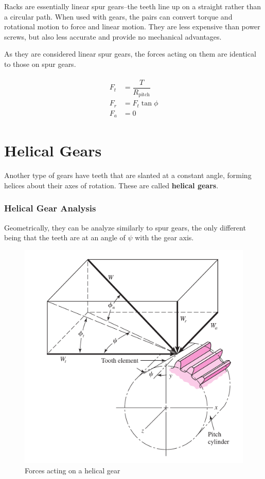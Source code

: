 \documentclass[a4paper,openany]{tufte-book}
\begin{document}
Racks are essentially linear spur gears--the teeth line up on a straight rather than a circular path. When used with gears, the pairs can convert torque and rotational motion to force and linear motion. They are less expensive than power screws, but also less accurate and provide no mechanical advantages.

As they are considered linear spur gears, the forces acting on them are identical to those on spur gears.

\begin{align}
  \begin{array}{ll}
  F_{t} &= \dfrac{T}{R_{\text{pitch}}} \\
  F_{r} &= F_t \tan \phi \\
  F_{a} &= 0
  \end{array}
\end{align}

\chapter{Helical Gears}
\label{sec:org5bc58f2}

Another type of gears have teeth that are slanted at a constant angle, forming helices about their axes of rotation. These are called \textbf{helical gears}.


\subsection{Helical Gear Analysis}
\label{sec:org992a3cf}

Geometrically, they can be analyze similarly to spur gears, the only different being that the teeth are at an angle of \(\psi\) with the gear axis.

\begin{figure}[htbp]
\centering
\includegraphics[width=.9\linewidth]{./pictures/Gears/helical-gear-forces.png}
\caption{\label{fig: helical gear forces}Forces acting on a helical gear}
\end{figure}
\end{document}
